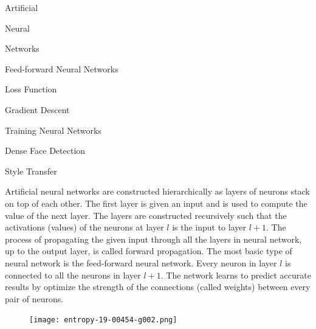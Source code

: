 \documentclass[17pt]{extarticle}
\begin{document}
\begin{center}
{\fontsize{200}{20}\selectfont Artificial}

\vfill

{\fontsize{200}{20}\selectfont Neural}

\vfill

{\fontsize{200}{20}\selectfont Networks}
\end{center}

\newpage


\begin{center}
{\fontsize{60}{20}\selectfont Feed-forward Neural Networks}

\vfill

{\fontsize{60}{20}\selectfont Loss Function}

\vfill

{\fontsize{60}{20}\selectfont Gradient Descent}

\vfill

{\fontsize{60}{20}\selectfont Training Neural Networks}

\vfill

{\fontsize{60}{20}\selectfont Dense Face Detection}

\vfill

{\fontsize{60}{20}\selectfont Style Transfer}
\end{center}

\newpage



Artificial neural networks are constructed hierarchically as layers of neurons stack on top of each other. The first layer is given an input and is used to compute the value of the next layer. The layers are constructed recursively such that the activations (values) of the neurons at layer $l$ is the input to layer $l+1$. The process of propagating the given input through all the layers in neural network, up to the output layer, is called forward propagation. The most basic type of neural network is the feed-forward neural network. Every neuron in layer $l$ is connected to all the neurons in layer $l+1$. The network learns to predict accurate results by optimize the strength of the connections (called weights) between every pair of neurons.

\vfill
\begin{figure}[h]
	\centering
  		\texttt{[image: entropy-19-00454-g002.png]}
\end{figure}
\end{document}
